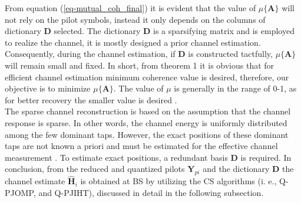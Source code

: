 From equation (\ref{eq-mutual_coh_final}) it is evident that the value of $\mu\{\mathbf{A}\}$ will not rely on the pilot symbols, instead it only depends on the columns of dictionary  $\mathbf{D}$ selected. 
The dictionary $\mathbf{D}$  is a sparsifying matrix and is employed to realize the channel, it is mostly designed a prior channel estimation. Consequently, during the channel estimation, if $\mathbf{D}$  is constructed tactfully, $\mu\{\mathbf{A}\}$ will remain small and fixed. In short, from theorem 1 it is obvious that for efficient channel estimation minimum coherence value is desired, therefore, our objective is to minimize $\mu\{\mathbf{A}\}$. The value of $\mu$ is generally in the range of 0-1, as for better recovery the smaller value is desired \cite{RIP_Mutual}.\\
The sparse channel reconstruction is based on the assumption that the channel response is sparse. In other words, the channel energy is uniformly distributed among the few dominant taps. However, the exact positions of these dominant taps are not known a priori and must be estimated for the effective channel measurement \cite{diclng}. To estimate exact positions, a redundant basis $\mathbf{D}$ is required. 
In conclusion, from the reduced and quantized pilots $\mathbf{Y}_{pi}$ and the dictionary $\mathbf{D}$ the channel estimate $\mathbf{\hat{H}}_i$ is obtained at BS by utilizing the CS algorithms (i. e., Q-PJOMP, and Q-PJIHT), discussed in detail in the following subsection.

